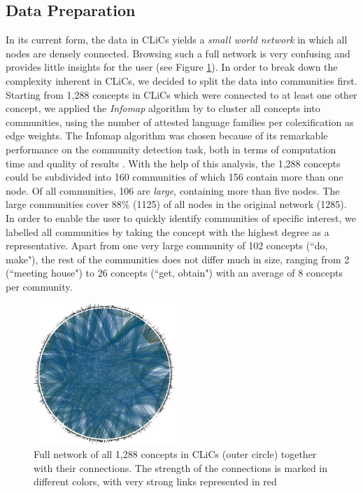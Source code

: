 \subsection{Data Preparation}
In its current form, the data in CLiCs yields a \emph{small world network} in which all nodes are
densely connected. Browsing such a full network is very confusing and provides little insights for
the user (see Figure \ref{fig:clics_full}). In order to break down the complexity inherent in CLiCs,
we decided to split the data into communities first.  Starting from 1,288 concepts in CLiCs which
were connected to at least one other concept, we applied the \emph{Infomap} algorithm by
 to cluster all concepts into communities, using the number of attested
language families per colexification as edge weights. The Infomap algorithm was chosen because of
its remarkable performance on the community detection task, both in terms of computation time and
quality of results \cite{Lancichinetti2009}.
With the help of this analysis, the 1,288 concepts
could be subdivided into 160 communities of which 156 contain more than one node. 
Of all communities, 106 are \emph{large}, containing more than
five nodes. The large communities cover 88\% (1125) of all nodes in the original network (1285). In
order to enable the user to quickly identify communities of specific interest, we labelled all
communities by taking the concept with the highest degree as a representative. Apart from one very
large community of 102 concepts (``do, make"), the rest of the communities does not differ much in
size, ranging from 2 (``meeting house") to 26 concepts (``get, obtain") with an average of 8 concepts per community.

\begin{figure}[b]
    \centering
   \includegraphics[width=0.48\textwidth]{img/completeNetworkLabels.jpg}
    \caption{Full network of all 1,288 concepts in CLiCs (outer circle) together with their connections. The strength of the connections is marked in different colors, with very strong links represented in red}
    \label{fig:clics_full}
\end{figure}

